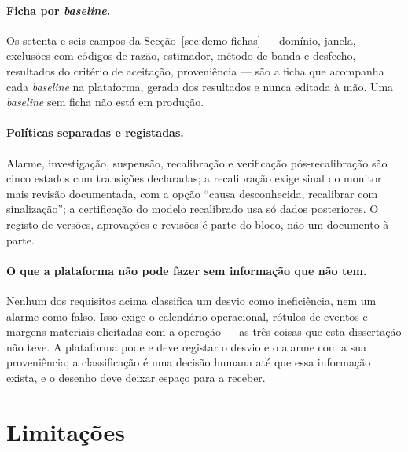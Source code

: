 \paragraph{Ficha por \emph{baseline}.} Os setenta e seis campos da
Secção~\ref{sec:demo-fichas} --- domínio, janela, exclusões com códigos de
razão, estimador, método de banda e desfecho, resultados do critério de
aceitação, proveniência --- são a ficha que acompanha cada \emph{baseline}
na plataforma, gerada dos resultados e nunca editada à mão. Uma
\emph{baseline} sem ficha não está em produção.

\paragraph{Políticas separadas e registadas.} Alarme, investigação, suspensão,
recalibração e verificação pós-recalibração são cinco estados com transições
declaradas; a recalibração exige sinal do monitor mais revisão documentada,
com a opção ``causa desconhecida, recalibrar com sinalização''; a
certificação do modelo recalibrado usa só dados posteriores. O registo de
versões, aprovações e revisões é parte do bloco, não um documento à parte.

\paragraph{O que a plataforma não pode fazer sem informação que não tem.}
Nenhum dos requisitos acima classifica um desvio como ineficiência, nem um
alarme como falso. Isso exige o calendário operacional, rótulos de eventos e
margens materiais elicitadas com a operação --- as três coisas que esta
dissertação não teve. A plataforma pode e deve registar o desvio e o alarme
com a sua proveniência; a classificação é uma decisão humana até que essa
informação exista, e o desenho deve deixar espaço para a receber.

\section{Limitações}
\label{sec:limitacoes}

